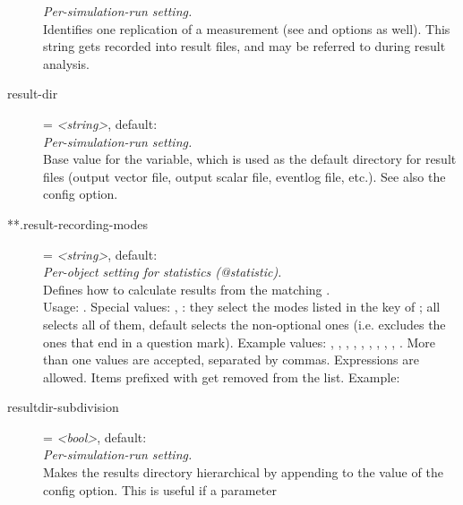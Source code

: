 \begin{description}
    \textit{Per-simulation-run setting.}\\
    Identifies one replication of a measurement (see  and
     options as well). This string gets
    recorded into result files, and may be referred to during result analysis.
\item[result-dir] = \textit{<string>}, default: \\
    \textit{Per-simulation-run setting.}\\
    Base value for the 
    variable, which is used as the default directory for result files (output
    vector file, output scalar file, eventlog file, etc.). See also the
     config option.
\item[**.result-recording-modes] = \textit{<string>}, default: \\
    \textit{Per-object setting for statistics (@statistic).}\\
    Defines how to calculate results from the matching
    .\\
    Usage:
    .
    Special values: , : they select the modes listed in
    the  key of ; all selects all of
    them, default selects the non-optional ones (i.e. excludes the ones that
    end in a question mark). Example values: , ,
    , , , , , ,
    , . More than one values are accepted, separated
    by commas. Expressions are allowed. Items prefixed with
    \ttt{-{\allowbreak}} get removed from the list. Example:
\item[resultdir-subdivision] = \textit{<bool>}, default: \\
    \textit{Per-simulation-run setting.}\\
    Makes the results directory hierarchical by appending
     to the value of the
     config option. This is useful if a parameter

\end{description}
